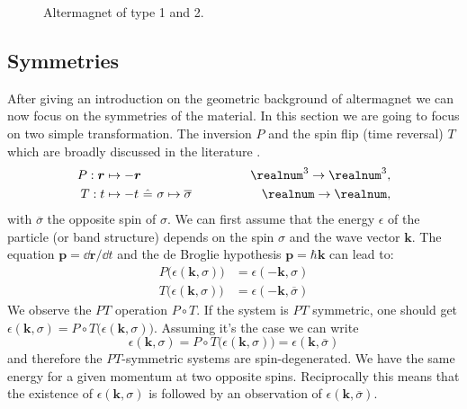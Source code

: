 \documentclass[../main.tex]{main.tex}
\begin{document}
\begin{figure}[H]

    \caption{Altermagnet of type 1 and 2.}
    \label{fig:altermagnet_lattice}
\end{figure}    

\subsection{Symmetries}
After giving an introduction on the geometric background of altermagnet we can now focus on the symmetries of the material. In this section
we are going to focus on two simple transformation. The inversion $P$ and the spin flip (time reversal) $T$ which are broadly discussed in the literature \cite{Smejkal2022}\cite{Smejkal2022_2}.
\begin{alignat*}{2}
    P : \bm{r} &\mapsto -\bm{r} ~~~~~~~~~~~~~~~~~~~~ &~~~\realnum^3 \rightarrow \realnum^3, \\
    T : t &\mapsto -t  ~\hat{=} ~\sigma \mapsto \overline{\sigma} &\realnum \rightarrow \realnum,
\end{alignat*}
with $\overline{\sigma}$ the opposite spin of $\sigma$.
We can first assume that the energy $\epsilon$ of the particle (or band structure) depends on the spin $\sigma$ and the wave vector $\bm{k}$. The equation $\bm{p} = \dd \bm{r}/\dd t$ and the de Broglie hypothesis 
$\bm{p} = \hbar\bm{k}$ \cite{Broglie1924} can lead to: 
\begin{align*}
    P \bigl(\epsilon(\bm{k}, \sigma)\bigr) &= \epsilon(-\bm{k}, \sigma)\\
    T \bigl(\epsilon(\bm{k}, \sigma)\bigr) &= \epsilon(-\bm{k}, \overline{\sigma})
\end{align*}
We observe the $PT$ operation $P\circ T$. If the system is $PT$ symmetric, one should get $\epsilon(\bm{k}, \sigma)= P\circ T\bigl(\epsilon(\bm{k}, \sigma)\bigr)$.
Assuming it's the case we can write
\[
    \epsilon(\bm{k}, \sigma)= P\circ T\bigl(\epsilon(\bm{k}, \sigma)\bigr) =  \epsilon(\bm{k}, \overline{\sigma})
\] 
and therefore the $PT$-symmetric systems are spin-degenerated. We have the same energy for a given momentum at two opposite spins.
 Reciprocally this means that the existence 
of $ \epsilon(\bm{k}, \sigma)$ is followed by an observation of $ \epsilon(\bm{k}, \overline{\sigma})$.\\
\end{document}
